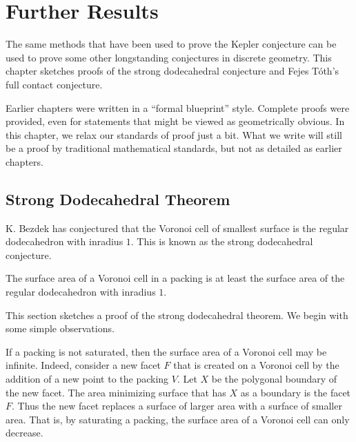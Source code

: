 
\chapter{Further Results}\label{sec:further}


The same methods that have been used to prove the Kepler conjecture
can be used to prove some other longstanding conjectures in discrete
geometry.  This chapter sketches proofs of the strong dodecahedral
conjecture and Fejes T\'oth's full contact conjecture.

Earlier chapters were written in a ``formal blueprint'' style.
Complete proofs were provided, even for statements that might be
viewed as geometrically obvious.  In this chapter, we relax our
standards of proof just a bit.  What we write will still be a proof by
traditional mathematical standards, but not as detailed as earlier
chapters.

\section{Strong Dodecahedral Theorem}

K. Bezdek has conjectured that the Voronoi cell of smallest surface is
the regular dodecahedron with inradius $1$.  This is known as the
strong dodecahedral conjecture.  %
%


\begin{theorem}
  The surface area of a Voronoi cell in a packing is at least the
  surface area of the regular dodecahedron with inradius $1$.
\end{theorem}

This section sketches a proof of the strong dodecahedral theorem.  We
begin with some simple observations.

\begin{remark}
  If a packing is not saturated, then the surface area of a Voronoi
  cell may be infinite.  
  Indeed, consider a new facet $F$ that is created on a Voronoi cell
  by the addition of a new point to the packing $V$.  Let $X$ be the
  polygonal boundary of the new facet.  The area minimizing surface
  that has $X$ as a boundary is the facet $F$.  Thus the new facet
  replaces a surface of larger area with a surface of smaller area.
  That is, by saturating a packing, the surface area of a Voronoi cell
  can only decrease.
\end{remark}


